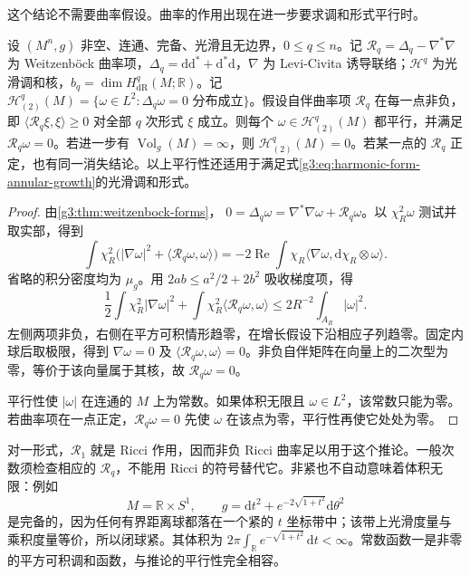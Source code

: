 这个结论不需要曲率假设。曲率的作用出现在进一步要求调和形式平行时。

\begin{corollary}\label{g3:cor:complete-l2-bochner-vanishing}
	设 \((M^n,g)\) 非空、连通、完备、光滑且无边界，\(0\le q\le n\)。记 \(\mathcal R_q=\Delta_q-\nabla^*\nabla\) 为 Weitzenböck 曲率项，\(\Delta_q=\mathrm d\mathrm d^*+\mathrm d^*\mathrm d\)，\(\nabla\) 为 Levi-Civita 诱导联络；\(\mathcal H^q\) 为光滑调和核，\(b_q=\dim H_{\mathrm{dR}}^q(M;\mathbb R)\)。记 \(\mathcal H_{(2)}^q(M)=\{\omega\in L^2:\Delta_q\omega=0\text{ 分布成立}\}\)。假设自伴曲率项 \(\mathcal R_q\) 在每一点非负，即
	\(\langle\mathcal R_q\xi,\xi\rangle\ge0\) 对全部 \(q\) 次形式 \(\xi\) 成立。则每个 \(\omega\in\mathcal H_{(2)}^q(M)\) 都平行，并满足 \(\mathcal R_q\omega=0\)。若进一步有 \(\operatorname{Vol}_g(M)=\infty\)，则 \(\mathcal H_{(2)}^q(M)=0\)。若某一点的 \(\mathcal R_q\) 正定，也有同一消失结论。以上平行性还适用于满足式\eqref{g3:eq:harmonic-form-annular-growth}的光滑调和形式。
\end{corollary}
\begin{proof}
	由\cref{g3:thm:weitzenbock-forms}，
	\(0=\Delta_q\omega=\nabla^*\nabla\omega+\mathcal R_q\omega\)。以 \(\chi_R^2\omega\) 测试并取实部，得到
	\[
		\int\chi_R^2\bigl(|\nabla\omega|^2
		+\langle\mathcal R_q\omega,\omega\rangle\bigr)
		=-2\operatorname{Re}\int
		\chi_R\langle\nabla\omega,\mathrm d\chi_R\otimes\omega\rangle.
	\]
	省略的积分密度均为 \(\mu_g\)。用 \(2ab\le a^2/2+2b^2\) 吸收梯度项，得
	\[
		\frac12\int\chi_R^2|\nabla\omega|^2
		+\int\chi_R^2\langle\mathcal R_q\omega,\omega\rangle
		\le2R^{-2}\int_{A_R}|\omega|^2.
	\]
	左侧两项非负，右侧在平方可积情形趋零，在增长假设下沿相应子列趋零。固定内球后取极限，得到 \(\nabla\omega=0\) 及 \(\langle\mathcal R_q\omega,\omega\rangle=0\)。非负自伴矩阵在向量上的二次型为零，等价于该向量属于其核，故 \(\mathcal R_q\omega=0\)。

	平行性使 \(|\omega|\) 在连通的 \(M\) 上为常数。如果体积无限且 \(\omega\in L^2\)，该常数只能为零。若曲率项在一点正定，\(\mathcal R_q\omega=0\) 先使 \(\omega\) 在该点为零，平行性再使它处处为零。
\end{proof}

对一形式，\(\mathcal R_1\) 就是 Ricci 作用，因而非负 Ricci 曲率足以用于这个推论。一般次数须检查相应的 \(\mathcal R_q\)，不能用 Ricci 的符号替代它。非紧也不自动意味着体积无限：例如
\[
	M=\mathbb R\times S^1,\qquad
	g=\mathrm dt^2+e^{-2\sqrt{1+t^2}}\mathrm d\theta^2
\]
是完备的，因为任何有界距离球都落在一个紧的 \(t\) 坐标带中；该带上光滑度量与乘积度量等价，所以闭球紧。其体积为 \(2\pi\int_{\mathbb R}e^{-\sqrt{1+t^2}}\,\mathrm dt<\infty\)。常数函数一是非零的平方可积调和函数，与推论的平行性完全相容。

